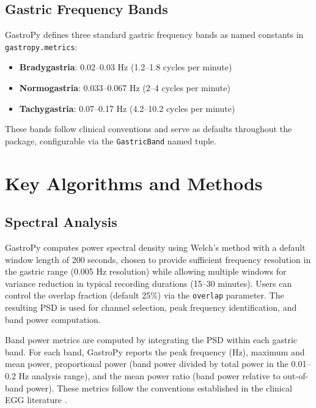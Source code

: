 \documentclass[12pt]{article}
\begin{document}
\subsection{Gastric Frequency Bands}

GastroPy defines three standard gastric frequency bands as named constants in
\texttt{gastropy.metrics}:

\begin{itemize}
  \item \textbf{Bradygastria}: 0.02--0.03 Hz (1.2--1.8 cycles per minute)
  \item \textbf{Normogastria}: 0.033--0.067 Hz (2--4 cycles per minute)
  \item \textbf{Tachygastria}: 0.07--0.17 Hz (4.2--10.2 cycles per minute)
\end{itemize}

These bands follow clinical conventions \citep{Koch2004, Chang2005, Yin2013}
and serve as defaults throughout the package, configurable via the
\texttt{GastricBand} named tuple.

\section{Key Algorithms and Methods}

\subsection{Spectral Analysis}

GastroPy computes power spectral density using Welch's method with a default
window length of 200 seconds, chosen to provide sufficient frequency
resolution in the gastric range (0.005 Hz resolution) while allowing multiple
windows for variance reduction in typical recording durations (15--30 minutes).
Users can control the overlap fraction (default 25\%) via the
\texttt{overlap} parameter. The resulting PSD is used for channel selection,
peak frequency identification, and band power computation.

Band power metrics are computed by integrating the PSD within each gastric
band. For each band, GastroPy reports the peak frequency (Hz), maximum and
mean power, proportional power (band power divided by total power in the
0.01--0.2 Hz analysis range), and the mean power ratio (band power relative to
out-of-band power). These metrics follow the conventions established in the
clinical EGG literature \citep{Koch2004, Chang2005}.
\end{document}
